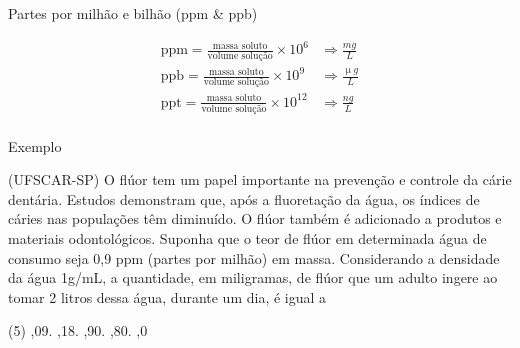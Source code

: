 \documentclass[presentation,professionalfonts,aspectratio=169]{beamer}
\begin{document}
\begin{frame}[label={sec:org50f596c}]{Partes por milhão e bilhão (ppm \& ppb)}



\begin{align*}
\text{ppm}=\frac{\text{massa soluto}}{\text{volume solução}} \times 10^6 & \Rightarrow  \frac{mg}{L}\\
\text{ppb}=\frac{\text{massa soluto}}{\text{volume solução}} \times 10^9 & \Rightarrow  \frac{\upmu g}{L}\\
\text{ppt}=\frac{\text{massa soluto}}{\text{volume solução}} \times 10^{12} & \Rightarrow  \frac{ng}{L}\\
\end{align*}
\end{frame}



\begin{frame}[label={sec:orgf6ed9a0}]{Exemplo}
\begin{question}
\alert{(UFSCAR-SP)} O flúor tem um papel importante na prevenção e controle da cárie dentária. Estudos demonstram que, após a fluoretação da água, os índices de cáries nas populações têm diminuído. O flúor também é adicionado a produtos e materiais odontológicos. Suponha que o teor de flúor em determinada água de consumo seja 0,9 ppm (partes por milhão) em massa. Considerando a densidade da água 1g/mL, a quantidade, em miligramas, de flúor que um adulto ingere ao tomar 2 litros dessa água, durante um dia, é igual a

\begin{choice}(5)
,09.
,18.
,90.
,80.
,0
\end{choice}
\end{question}
\end{frame}
\end{document}
